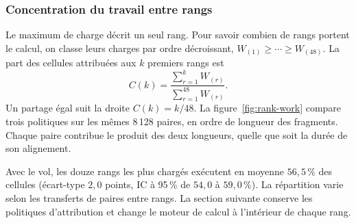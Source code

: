 \subsubsection{Concentration du travail entre rangs}\label{sec:concentration}

Le maximum de charge décrit un seul rang. Pour savoir combien de rangs portent le calcul, on classe leurs charges par ordre décroissant, \(W_{(1)}\ge\cdots\ge W_{(48)}\). La part des cellules attribuées aux \(k\) premiers rangs est
\[
  C(k)=\frac{\sum_{r=1}^{k}W_{(r)}}{\sum_{r=1}^{48}W_{(r)}}.
\]
Un partage égal suit la droite \(C(k)=k/48\). La figure~\ref{fig:rank-work} compare trois politiques sur les mêmes 8\,128 paires, en ordre de longueur des fragments. Chaque paire contribue le produit des deux longueurs, quelle que soit la durée de son alignement.

Avec le vol, les douze rangs les plus chargés exécutent en moyenne \(56{,}5\,\%\) des cellules (écart-type \(2{,}0\) points, IC à 95\,\% de \(54{,}0\) à \(59{,}0\,\%\)). La répartition varie selon les transferts de paires entre rangs. La section suivante conserve les politiques d’attribution et change le moteur de calcul à l’intérieur de chaque rang.

